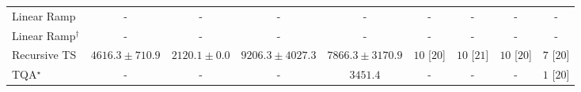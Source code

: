 \begin{tabular}{l|cccc|cccc|}
Linear Ramp & {\cellcolor[HTML]{000000}} \color[HTML]{F1F1F1} {\cellcolor{white}} \color{black} - & {\cellcolor[HTML]{000000}} \color[HTML]{F1F1F1} {\cellcolor{white}} \color{black} - & {\cellcolor[HTML]{000000}} \color[HTML]{F1F1F1} {\cellcolor{white}} \color{black} - & {\cellcolor[HTML]{000000}} \color[HTML]{F1F1F1} {\cellcolor{white}} \color{black} - & {\cellcolor[HTML]{000000}} \color[HTML]{F1F1F1} {\cellcolor{white}} \color{black} - & {\cellcolor[HTML]{000000}} \color[HTML]{F1F1F1} {\cellcolor{white}} \color{black} - & {\cellcolor[HTML]{000000}} \color[HTML]{F1F1F1} {\cellcolor{white}} \color{black} - & {\cellcolor[HTML]{000000}} \color[HTML]{F1F1F1} {\cellcolor{white}} \color{black} - \\
Linear Ramp$^\dagger$ & {\cellcolor[HTML]{000000}} \color[HTML]{F1F1F1} {\cellcolor{white}} \color{black} - & {\cellcolor[HTML]{000000}} \color[HTML]{F1F1F1} {\cellcolor{white}} \color{black} - & {\cellcolor[HTML]{000000}} \color[HTML]{F1F1F1} {\cellcolor{white}} \color{black} - & {\cellcolor[HTML]{000000}} \color[HTML]{F1F1F1} {\cellcolor{white}} \color{black} - & {\cellcolor[HTML]{000000}} \color[HTML]{F1F1F1} {\cellcolor{white}} \color{black} - & {\cellcolor[HTML]{000000}} \color[HTML]{F1F1F1} {\cellcolor{white}} \color{black} - & {\cellcolor[HTML]{000000}} \color[HTML]{F1F1F1} {\cellcolor{white}} \color{black} - & {\cellcolor[HTML]{000000}} \color[HTML]{F1F1F1} {\cellcolor{white}} \color{black} - \\
Recursive TS & {\cellcolor[HTML]{9EBAD9}} \color[HTML]{000000} $4616.3\pm 710.9$ & {\cellcolor[HTML]{F5EEF6}} \color[HTML]{000000} $2120.1\pm 0.0$ & {\cellcolor[HTML]{023858}} \color[HTML]{F1F1F1} $9206.3\pm 4027.3$ & {\cellcolor[HTML]{04639B}} \color[HTML]{F1F1F1} $7866.3\pm 3170.9$ & {\cellcolor[HTML]{49006A}} \color[HTML]{F1F1F1} $10$ [$20$] & {\cellcolor[HTML]{49006A}} \color[HTML]{F1F1F1} $10$ [$21$] & {\cellcolor[HTML]{49006A}} \color[HTML]{F1F1F1} $10$ [$20$] & {\cellcolor[HTML]{CD238F}} \color[HTML]{F1F1F1} $7$ [$20$] \\
TQA$^\star$ & {\cellcolor[HTML]{000000}} \color[HTML]{F1F1F1} {\cellcolor{white}} \color{black} - & {\cellcolor[HTML]{000000}} \color[HTML]{F1F1F1} {\cellcolor{white}} \color{black} - & {\cellcolor[HTML]{000000}} \color[HTML]{F1F1F1} {\cellcolor{white}} \color{black} - & {\cellcolor[HTML]{D2D2E7}} \color[HTML]{000000} $3451.4$ & {\cellcolor[HTML]{000000}} \color[HTML]{F1F1F1} {\cellcolor{white}} \color{black} - & {\cellcolor[HTML]{000000}} \color[HTML]{F1F1F1} {\cellcolor{white}} \color{black} - & {\cellcolor[HTML]{000000}} \color[HTML]{F1F1F1} {\cellcolor{white}} \color{black} - & {\cellcolor[HTML]{FFF7F3}} \color[HTML]{000000} $1$ [$20$] \\

\end{tabular}
